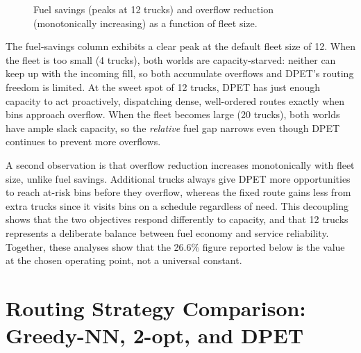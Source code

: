 \begin{figure}[H]
\centering
{}
\caption{Fuel savings (peaks at 12 trucks) and overflow reduction (monotonically increasing) as a function of fleet size.}
\label{fig:fleet_sensitivity}
\end{figure}

\indent The fuel-savings column exhibits a clear peak at the default fleet size of 12. When the fleet is too small (4 trucks), both worlds are capacity-starved: neither can keep up with the incoming fill, so both accumulate overflows and DPET's routing freedom is limited. At the sweet spot of 12 trucks, DPET has just enough capacity to act proactively, dispatching dense, well-ordered routes exactly when bins approach overflow. When the fleet becomes large (20 trucks), both worlds have ample slack capacity, so the \textit{relative} fuel gap narrows even though DPET continues to prevent more overflows.

\indent A second observation is that overflow reduction increases monotonically with fleet size, unlike fuel savings. Additional trucks always give DPET more opportunities to reach at-risk bins before they overflow, whereas the fixed route gains less from extra trucks since it visits bins on a schedule regardless of need. This decoupling shows that the two objectives respond differently to capacity, and that 12 trucks represents a deliberate balance between fuel economy and service reliability. Together, these analyses show that the 26.6\% figure reported below is the value at the chosen operating point, not a universal constant.

\section{Routing Strategy Comparison: Greedy-NN, 2-opt, and DPET}
\label{sec:routing_cmp}


